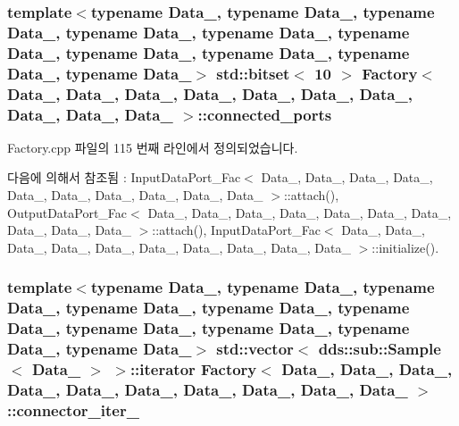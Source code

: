 \subsubsection[{\texorpdfstring{connected\+\_\+ports}{connected_ports}}]{\setlength{\rightskip}{0pt plus 5cm}template$<$typename Data\+\_, typename Data\+\_, typename Data\+\_, typename Data\+\_, typename Data\+\_, typename Data\+\_, typename Data\+\_, typename Data\+\_, typename Data\+\_, typename Data\+\_$>$ std\+::bitset$<$ 10 $>$ {\bf Factory}$<$ Data\+\_, Data\+\_, Data\+\_, Data\+\_, Data\+\_, Data\+\_, Data\+\_, Data\+\_, Data\+\_, Data\+\_ $>$\+::connected\+\_\+ports}\hypertarget{classFactory_a47d1a95acef574eae4410faf891130df}{}\label{classFactory_a47d1a95acef574eae4410faf891130df}


Factory.\+cpp 파일의 115 번째 라인에서 정의되었습니다.



다음에 의해서 참조됨 \+:  Input\+Data\+Port\+\_\+\+Fac$<$ Data\+\_, Data\+\_, Data\+\_, Data\+\_, Data\+\_, Data\+\_, Data\+\_, Data\+\_, Data\+\_, Data\+\_ $>$\+::attach(), Output\+Data\+Port\+\_\+\+Fac$<$ Data\+\_, Data\+\_, Data\+\_, Data\+\_, Data\+\_, Data\+\_, Data\+\_, Data\+\_, Data\+\_, Data\+\_ $>$\+::attach(), Input\+Data\+Port\+\_\+\+Fac$<$ Data\+\_, Data\+\_, Data\+\_, Data\+\_, Data\+\_, Data\+\_, Data\+\_, Data\+\_, Data\+\_, Data\+\_ $>$\+::initialize().

\subsubsection[{\texorpdfstring{connector\+\_\+iter\+\_\+1}{connector_iter_1}}]{\setlength{\rightskip}{0pt plus 5cm}template$<$typename Data\+\_, typename Data\+\_, typename Data\+\_, typename Data\+\_, typename Data\+\_, typename Data\+\_, typename Data\+\_, typename Data\+\_, typename Data\+\_, typename Data\+\_$>$ std\+::vector$<$ dds\+::sub\+::\+Sample$<$ Data\+\_ $>$ $>$\+::iterator {\bf Factory}$<$ Data\+\_, Data\+\_, Data\+\_, Data\+\_, Data\+\_, Data\+\_, Data\+\_, Data\+\_, Data\+\_, Data\+\_ $>$\+::connector\+\_\+iter\+\_}\hypertarget{classFactory_a560460eae381287c085b613c5330dadd}{}\label{classFactory_a560460eae381287c085b613c5330dadd}


